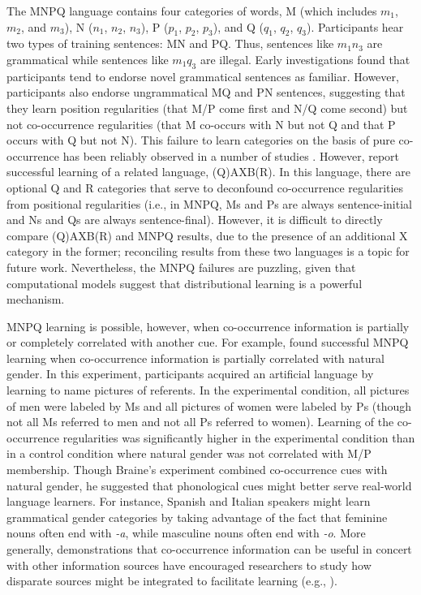 \documentclass[man,floatsintext]{apa6}
\begin{document}
The MNPQ language contains four categories of words, M (which includes $m_1$, $m_2$, and $m_3$), N ($n_1$, $n_2$, $n_3$), P ($p_1$, $p_2$, $p_3$), and Q ($q_1$, $q_2$, $q_3$). Participants hear two types of training sentences: MN and PQ. Thus, sentences like $m_1 n_3$ are grammatical while sentences like $m_1 q_3$ are illegal. Early investigations \citep{braine1966, smith1966} found that participants tend to endorse novel grammatical sentences as familiar. However, participants also endorse ungrammatical MQ and PN sentences, suggesting that they learn position regularities (that M/P come first and N/Q come second) but not co-occurrence regularities (that M co-occurs with N but not Q and that P occurs with Q but not N). This failure to learn categories on the basis of pure co-occurrence has been reliably observed in a number of studies \citep{braine1987, brooks1993, frigo1998, kempe2001, gerken2005, lany2010, frank2011}. However, \citet[Experiment 5]{reeder2009} report successful learning of a related language, (Q)AXB(R). In this language, there are optional Q and R categories that serve to deconfound co-occurrence regularities from positional regularities (i.e., in MNPQ, Ms and Ps are always sentence-initial and Ns and Qs are always sentence-final). However, it is difficult to directly compare (Q)AXB(R) and MNPQ results, due to the presence of an additional X category in the former; reconciling results from these two languages is a topic for future work. Nevertheless, the MNPQ failures are puzzling, given that computational models suggest that distributional learning is a powerful mechanism.

MNPQ learning is possible, however, when co-occurrence information is partially or completely correlated with another cue. For example, \citet{braine1987} found successful MNPQ learning when co-occurrence information is partially correlated with natural gender. In this experiment, participants acquired an artificial language by learning to name pictures of referents. In the experimental condition, all pictures of men were labeled by Ms and all pictures of women were labeled by Ps (though not all Ms referred to men and not all Ps referred to women). Learning of the co-occurrence regularities was significantly higher in the experimental condition than in a control condition where natural gender was not correlated with M/P membership. Though Braine's experiment combined co-occurrence cues with natural gender, he suggested that phonological cues might better serve real-world language learners. For instance, Spanish and Italian speakers might learn grammatical gender categories by taking advantage of the fact that feminine nouns often end with \emph{-a}, while masculine nouns often end with \emph{-o}. More generally, demonstrations that co-occurrence information can be useful in concert with other information sources have encouraged researchers to study how disparate sources might be integrated to facilitate learning (e.g., \citealp{monaghan2005, johns2012}).
\end{document}
